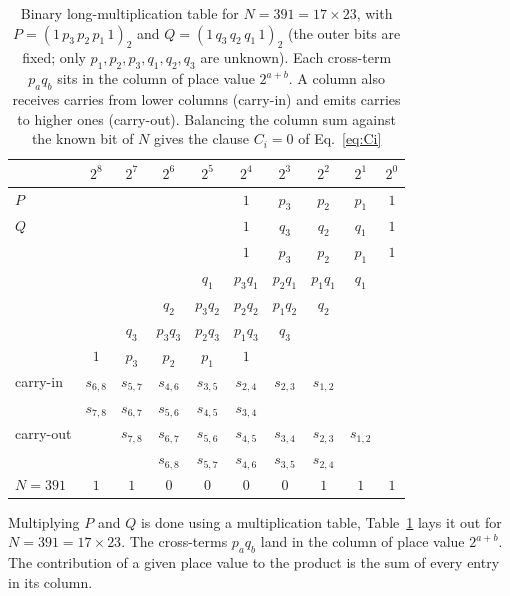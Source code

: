\documentclass[pdflatex,sn-apa]{sn-jnl}%
\theoremstyle{thmstyleone}%
\theoremstyle{thmstyletwo}%
\theoremstyle{thmstylethree}%
\begin{document}
\begin{table}[tp]
\centering
\caption{Binary long-multiplication table for $N = 391 = 17 \times 23$,
with $P = (1\,p_3\,p_2\,p_1\,1)_2$ and
$Q = (1\,q_3\,q_2\,q_1\,1)_2$ (the outer bits are fixed; only
$p_1,p_2,p_3,q_1,q_2,q_3$ are unknown). Each cross-term $p_a q_b$ sits
in the column of place value $2^{a+b}$. A column also receives carries
from lower columns (carry-in) and emits carries to higher ones
(carry-out). Balancing the column sum against the known bit of $N$
gives the clause $C_i = 0$ of Eq.~\eqref{eq:Ci}}\label{tab:multtable}
\small
\setlength{\tabcolsep}{8pt}
\renewcommand{\arraystretch}{1}
\begin{tabular}{l|ccccccccc}
\toprule
& $2^8$ & $2^7$ & $2^6$ & $2^5$ & $2^4$ & $2^3$ & $2^2$ & $2^1$ & $2^0$ \\
\midrule
$P$ & & & & & $1$   & $p_3$ & $p_2$ & $p_1$ & $1$ \\
$Q$ & & & & & $1$   & $q_3$ & $q_2$ & $q_1$ & $1$ \\
\midrule
            & & & & & $1$ & $p_3$ & $p_2$ & $p_1$ & $1$ \\
            & & & & $q_1$ & $p_3 q_1$ & $p_2 q_1$ & $p_1 q_1$ & $q_1$ & \\
            & & & $q_2$ & $p_3 q_2$ & $p_2 q_2$ & $p_1 q_2$ & $q_2$ & & \\
            & & $q_3$ & $p_3 q_3$ & $p_2 q_3$ & $p_1 q_3$ & $q_3$ & & & \\
            & $1$ & $p_3$ & $p_2$ & $p_1$ & $1$ & & & & \\
\midrule
carry-in    & $s_{6,8}$ & $s_{5,7}$ & $s_{4,6}$ & $s_{3,5}$ & $s_{2,4}$ & $s_{2,3}$ & $s_{1,2}$ & & \\
            & $s_{7,8}$ & $s_{6,7}$ & $s_{5,6}$ & $s_{4,5}$ & $s_{3,4}$ & & & & \\
\midrule
carry-out   & & $s_{7,8}$ & $s_{6,7}$ & $s_{5,6}$ & $s_{4,5}$ & $s_{3,4}$ & $s_{2,3}$ & $s_{1,2}$ & \\
            & & & $s_{6,8}$ & $s_{5,7}$ & $s_{4,6}$ & $s_{3,5}$ & $s_{2,4}$ & & \\
\midrule
$N = 391$   & $1$ & $1$ & $0$ & $0$ & $0$ & $0$ & $1$ & $1$ & $1$ \\
\bottomrule
\end{tabular}
\end{table}

Multiplying $P$ and $Q$ is done using a multiplication table, Table~\ref{tab:multtable} lays it out for $N = 391 = 17 \times 23$. The cross-terms $p_a q_b$ land in the column of place value $2^{a+b}$. The contribution of a given place value to the product is the sum of every entry in its column.
\end{document}
